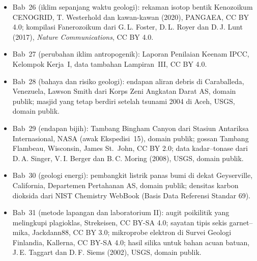 \begin{itemize}
  \item Bab~26 (iklim sepanjang waktu geologi): rekaman isotop bentik Kenozoikum CENOGRID, T. Westerhold dan kawan-kawan (2020), PANGAEA, CC BY 4.0; kompilasi  Fanerozoikum dari G.\,L. Foster, D.\,L. Royer dan D.\,J. Lunt (2017), \emph{Nature Communications}, CC BY 4.0.
  \item Bab~27 (perubahan iklim antropogenik): Laporan Penilaian Keenam IPCC, Kelompok Kerja~I, data tambahan Lampiran~III, CC BY 4.0.
  \item Bab~28 (bahaya dan risiko geologi): endapan aliran debris di Caraballeda, Venezuela, Lawson Smith dari Korps Zeni Angkatan Darat AS, domain publik; masjid yang tetap berdiri setelah tsunami 2004 di Aceh, USGS, domain publik.
  \item Bab~29 (endapan bijih): Tambang Bingham Canyon dari Stasiun Antariksa Internasional, NASA (awak Ekspedisi~15), domain publik; gossan Tambang Flambeau, Wisconsin, James St.~John, CC BY 2.0; data kadar--tonase dari D.\,A. Singer, V.\,I. Berger dan B.\,C. Moring (2008), USGS, domain publik.
  \item Bab~30 (geologi energi): pembangkit listrik panas bumi di dekat Geyserville, California, Departemen Pertahanan AS, domain publik; densitas karbon dioksida dari NIST Chemistry WebBook (Basis Data Referensi Standar 69).
  \item Bab~31 (metode lapangan dan laboratorium II): augit poikilitik yang melingkupi plagioklas, Strekeisen, CC BY-SA 4.0; sayatan tipis sekis garnet--mika, Jackdann88, CC BY 3.0; mikroprobe elektron di Survei Geologi Finlandia, Kallerna, CC BY-SA 4.0; hasil silika untuk bahan acuan batuan, J.\,E. Taggart dan D.\,F. Siems (2002), USGS, domain publik.
\end{itemize}
